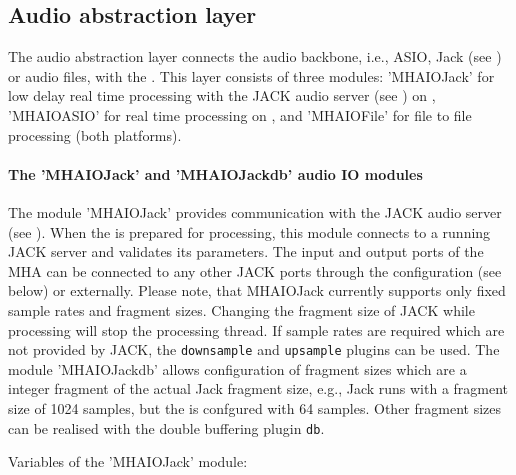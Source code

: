 
\subsection{Audio abstraction layer}%
\label{sec:audioabstraction}

The audio abstraction layer connects the audio backbone, i.e., ASIO,
Jack (see ) or audio files, with the \mhad{}.
%
This layer consists of three modules: 'MHAIOJack' for low delay real
time processing with the JACK audio server (see )
on \Linux{}, 'MHAIOASIO' for real time processing on \Windows{}, and
'MHAIOFile' for file to file processing (both platforms).

\paragraph{The 'MHAIOJack' and 'MHAIOJackdb' audio IO modules}%
%
%

The module 'MHAIOJack' provides communication with the JACK audio
server (see ).
%
When the \mhad{} is prepared for processing, this module connects to a
running JACK server and validates its parameters. The input and output
ports of the MHA can be connected to any other JACK ports through the
\mha{} configuration (see below) or externally. Please note, that
MHAIOJack currently supports only fixed sample rates and fragment
sizes. Changing the fragment size of JACK while processing will stop
the \mha{} processing thread. If sample rates are required which are not
provided by JACK, the {\tt downsample} and {\tt upsample} plugins can
be used. The module 'MHAIOJackdb' allows configuration of \mha{} fragment
sizes which are a integer fragment of the actual Jack fragment size,
e.g., Jack runs with a fragment size of 1024 samples, but the \mha{} is
confgured with 64 samples.  Other fragment sizes can be realised with
the double buffering plugin {\tt db}.

Variables of the 'MHAIOJack' module:

